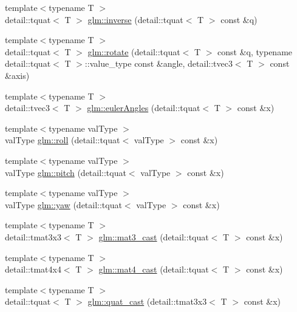 \begin{DoxyCompactItemize}
{\footnotesize template$<$typename T $>$ }\\detail\+::tquat$<$ T $>$ \hyperlink{group__gtc__quaternion_ga78b87a5e7152108e0dff0855d81b3bc1}{glm\+::inverse} (detail\+::tquat$<$ T $>$ const \&q)
\item 
{\footnotesize template$<$typename T $>$ }\\detail\+::tquat$<$ T $>$ \hyperlink{group__gtc__quaternion_ga297d6a9635153c76d7c011efa716b5da}{glm\+::rotate} (detail\+::tquat$<$ T $>$ const \&q, typename detail\+::tquat$<$ T $>$\+::value\+\_\+type const \&angle, detail\+::tvec3$<$ T $>$ const \&axis)
\item 
{\footnotesize template$<$typename T $>$ }\\detail\+::tvec3$<$ T $>$ \hyperlink{group__gtc__quaternion_gaa53e0e8933e176c6207720433fb8dd2b}{glm\+::euler\+Angles} (detail\+::tquat$<$ T $>$ const \&x)
\item 
{\footnotesize template$<$typename val\+Type $>$ }\\val\+Type \hyperlink{group__gtc__quaternion_ga7ef4c8c1ce1ca988add2f73392db0a06}{glm\+::roll} (detail\+::tquat$<$ val\+Type $>$ const \&x)
\item 
{\footnotesize template$<$typename val\+Type $>$ }\\val\+Type \hyperlink{group__gtc__quaternion_gaf2a0323dbf6c6fb3f37b445aa899c1c7}{glm\+::pitch} (detail\+::tquat$<$ val\+Type $>$ const \&x)
\item 
{\footnotesize template$<$typename val\+Type $>$ }\\val\+Type \hyperlink{group__gtc__quaternion_gaac012c1a6bc37ce07a87745d9c596eed}{glm\+::yaw} (detail\+::tquat$<$ val\+Type $>$ const \&x)
\item 
{\footnotesize template$<$typename T $>$ }\\detail\+::tmat3x3$<$ T $>$ \hyperlink{group__gtc__quaternion_gae04ce320008c9bec0037b4ba21853cb5}{glm\+::mat3\+\_\+cast} (detail\+::tquat$<$ T $>$ const \&x)
\item 
{\footnotesize template$<$typename T $>$ }\\detail\+::tmat4x4$<$ T $>$ \hyperlink{group__gtc__quaternion_ga8c376eb15971eb52d85df5ee26825627}{glm\+::mat4\+\_\+cast} (detail\+::tquat$<$ T $>$ const \&x)
\item 
{\footnotesize template$<$typename T $>$ }\\detail\+::tquat$<$ T $>$ \hyperlink{group__gtc__quaternion_ga4d37447d81ceade1d10d68c995a4d881}{glm\+::quat\+\_\+cast} (detail\+::tmat3x3$<$ T $>$ const \&x)
\item 

\end{DoxyCompactItemize}
